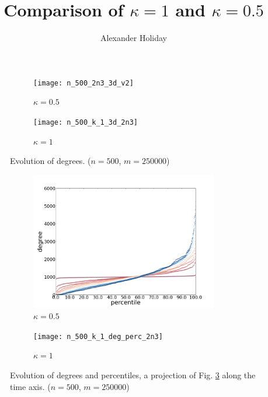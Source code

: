 \documentclass[11pt]{article}
\begin{document}
\title{\vspace{-5mm}Comparison of $\kappa=1$ and $\kappa=0.5$}
\author{Alexander Holiday}
\date{}
\maketitle
\vspace{3cm}
\begin{changemargin}{0.0cm}{0.0cm}
\begin{figure}[h!]
  \vspace{-30mm}
  \begin{subfigure}{0.5\textwidth}
    \texttt{[image: n\_500\_2n3\_3d\_v2]}
    \caption{$\kappa=0.5$}
    \label{fig:100s3}
  \end{subfigure}%
  \begin{subfigure}{0.5\textwidth}
    \texttt{[image: n\_500\_k\_1\_3d\_2n3]}
    \caption{$\kappa=1$}
    \label{fig:100s3}
  \end{subfigure}%
  \caption{Evolution of degrees. ($n=500$, $m=250000$)}
  \label{fig:n500_3d}
\end{figure}

\begin{figure}[h!]
  \vspace{-5mm}
  \centering
  \begin{subfigure}{0.5\textwidth}
    \centering
    \includegraphics[height=60mm]{n_500_2n3_deg_percentile}
    \caption{$\kappa=0.5$}
    \label{fig:100s3}
  \end{subfigure}%
  \begin{subfigure}{0.5\textwidth}
    \centering
    \texttt{[image: n\_500\_k\_1\_deg\_perc\_2n3]}
    \caption{$\kappa=1$}
    \label{fig:100s3}
  \end{subfigure}%
  \caption{Evolution of degrees and percentiles, a projection of Fig. \ref{fig:n500_3d} along the time axis. ($n=500$, $m=250000$)}
\end{figure}


\end{changemargin}
\end{document}

